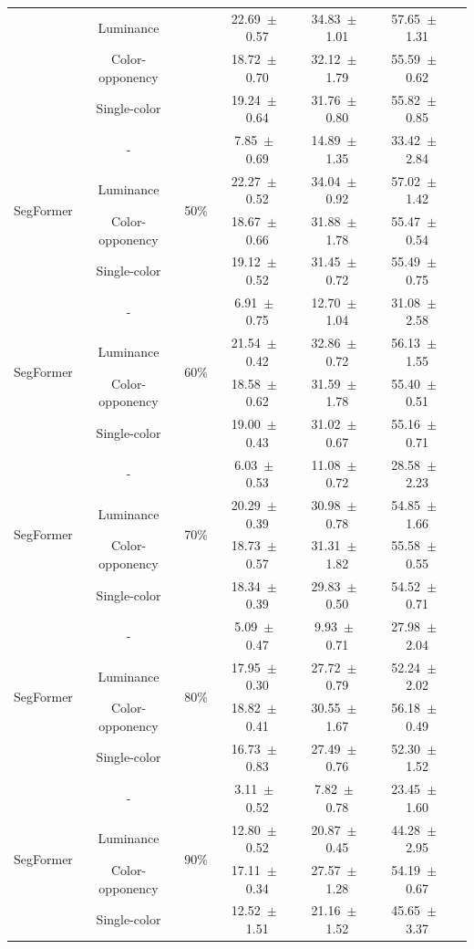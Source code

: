 \begin{table}[h]
\begin{tabular}{@{}lccc ccc@{}}
& Luminance & & 22.69~$\pm$~0.57 & 34.83~$\pm$~1.01 & 57.65~$\pm$~1.31 \\
& Color-opponency & & 18.72~$\pm$~0.70 & 32.12~$\pm$~1.79 & 55.59~$\pm$~0.62 \\
& Single-color & & 19.24~$\pm$~0.64 & 31.76~$\pm$~0.80 & 55.82~$\pm$~0.85 \\
\midrule
\multirow{4}{*}{SegFormer} & - & \multirow{4}{*}{50\%} & 7.85~$\pm$~0.69 & 14.89~$\pm$~1.35 & 33.42~$\pm$~2.84 \\
& Luminance & & 22.27~$\pm$~0.52 & 34.04~$\pm$~0.92 & 57.02~$\pm$~1.42 \\
& Color-opponency & & 18.67~$\pm$~0.66 & 31.88~$\pm$~1.78 & 55.47~$\pm$~0.54 \\
& Single-color & & 19.12~$\pm$~0.52 & 31.45~$\pm$~0.72 & 55.49~$\pm$~0.75 \\
\midrule
\multirow{4}{*}{SegFormer} & - & \multirow{4}{*}{60\%} & 6.91~$\pm$~0.75 & 12.70~$\pm$~1.04 & 31.08~$\pm$~2.58 \\
& Luminance & & 21.54~$\pm$~0.42 & 32.86~$\pm$~0.72 & 56.13~$\pm$~1.55 \\
& Color-opponency & & 18.58~$\pm$~0.62 & 31.59~$\pm$~1.78 & 55.40~$\pm$~0.51 \\
& Single-color & & 19.00~$\pm$~0.43 & 31.02~$\pm$~0.67 & 55.16~$\pm$~0.71 \\
\midrule
\multirow{4}{*}{SegFormer} & - & \multirow{4}{*}{70\%} & 6.03~$\pm$~0.53 & 11.08~$\pm$~0.72 & 28.58~$\pm$~2.23 \\
& Luminance & & 20.29~$\pm$~0.39 & 30.98~$\pm$~0.78 & 54.85~$\pm$~1.66 \\
& Color-opponency & & 18.73~$\pm$~0.57 & 31.31~$\pm$~1.82 & 55.58~$\pm$~0.55 \\
& Single-color & & 18.34~$\pm$~0.39 & 29.83~$\pm$~0.50 & 54.52~$\pm$~0.71 \\
\midrule
\multirow{4}{*}{SegFormer} & - & \multirow{4}{*}{80\%} & 5.09~$\pm$~0.47 & 9.93~$\pm$~0.71 & 27.98~$\pm$~2.04 \\
& Luminance & & 17.95~$\pm$~0.30 & 27.72~$\pm$~0.79 & 52.24~$\pm$~2.02 \\
& Color-opponency & & 18.82~$\pm$~0.41 & 30.55~$\pm$~1.67 & 56.18~$\pm$~0.49 \\
& Single-color & & 16.73~$\pm$~0.83 & 27.49~$\pm$~0.76 & 52.30~$\pm$~1.52 \\
\midrule
\multirow{4}{*}{SegFormer} & - & \multirow{4}{*}{90\%} & 3.11~$\pm$~0.52 & 7.82~$\pm$~0.78 & 23.45~$\pm$~1.60 \\
& Luminance & & 12.80~$\pm$~0.52 & 20.87~$\pm$~0.45 & 44.28~$\pm$~2.95 \\
& Color-opponency & & 17.11~$\pm$~0.34 & 27.57~$\pm$~1.28 & 54.19~$\pm$~0.67 \\
& Single-color & & 12.52~$\pm$~1.51 & 21.16~$\pm$~1.52 & 45.65~$\pm$~3.37 \\
\midrule
\bottomrule
\end{tabular}
\label{tab:sparse_results_segformer_acdc_night}
\end{table}